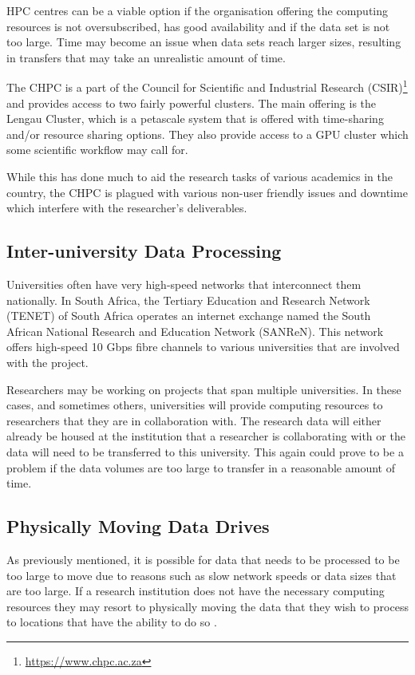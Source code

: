 HPC centres can be a viable option if the organisation offering the computing resources is not oversubscribed, has good availability and if the data set is not too large. Time may become an issue when data sets reach larger sizes, resulting in transfers that may take an unrealistic amount of time.

The CHPC is a part of the Council for Scientific and Industrial Research (CSIR)\footnote{\url{https://www.chpc.ac.za}} and provides access to two fairly powerful clusters. The main offering is the Lengau Cluster, which is a petascale system that is offered with time-sharing and/or resource sharing options. They also provide access to a GPU cluster which some scientific workflow may call for.

While this has done much to aid the research tasks of various academics in the country, the CHPC is plagued with various non-user friendly issues and downtime which interfere with the researcher's deliverables.

\subsection{Inter-university Data Processing}

Universities often have very high-speed networks that interconnect them nationally. In South Africa, the Tertiary Education and Research Network (TENET) of South Africa operates an internet exchange named the South African National Research and Education Network (SANReN). This network offers high-speed 10 Gbps fibre channels to various universities that are involved with the project.

Researchers may be working on projects that span multiple universities. In these cases, and sometimes others, universities will provide computing resources to researchers that they are in collaboration with. The research data will either already be housed at the institution that a researcher is collaborating with or the data will need to be transferred to this university. This again could prove to be a problem if the data volumes are too large to transfer in a reasonable amount of time.

\subsection{Physically Moving Data Drives}

As previously mentioned, it is possible for data that needs to be processed to be too large to move due to reasons such as slow network speeds or data sizes that are too large. If a research institution does not have the necessary computing resources they may resort to physically moving the data that they wish to process to locations that have the ability to do so \parencite{marx2013biology}.

